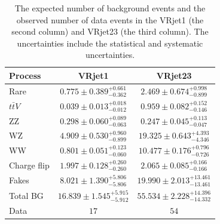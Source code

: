 \begin{table}[htbp]
\begin{center}
\begin{tabular}{|l|c|c|}
\hline
\hline
Process & VRjet1 & VRjet23 \\
\hline
\hline
Rare        & $0.775\pm 0.389^{+0.661}_{-0.362}$ & $2.469 \pm 0.674^{+0.998} _{-0.899}$ \\
$t\bar{t}V$ & $0.039\pm 0.013^{+0.018}_{-0.012}$ & $0.959 \pm 0.082^{+0.152} _{-0.146}$ \\
ZZ          & $0.298\pm 0.060^{+0.089}_{-0.063}$ & $0.247 \pm 0.045^{+0.113} _{-0.047}$ \\
WZ          & $4.909\pm 0.530^{+0.960}_{-0.899}$ & $19.325\pm 0.643^{+4.393} _{-4.346}$ \\
WW          & $0.801\pm 0.051^{+0.123}_{-0.060}$ & $10.477\pm 0.176^{+0.796} _{-0.726}$ \\
Charge flip & $1.997\pm 0.128^{+0.260}_{-0.260}$ & $2.065 \pm 0.085^{+0.166} _{-0.166}$ \\
Fakes       & $8.021\pm 1.390^{+5.806}_{-5.806}$ & $19.990\pm 2.013^{+13.461}_{-13.461}$ \\
\hline
Total BG      & $16.839\pm 1.545^{+5.915}_{-5.912}$ & $55.534\pm 2.228^{+14.396}_{-14.332}$ \\
\hline
\hline
Data        & $17$ & $54$ \\
\hline
\hline
\end{tabular}
\caption{The expected number of background events and the observed number of data events in the VRjet1 (the second column) and VRjet23 (the third column). The uncertainties include the statistical and systematic uncertainties.}
\label{tab:VR_yields}
\end{center}
\end{table}

